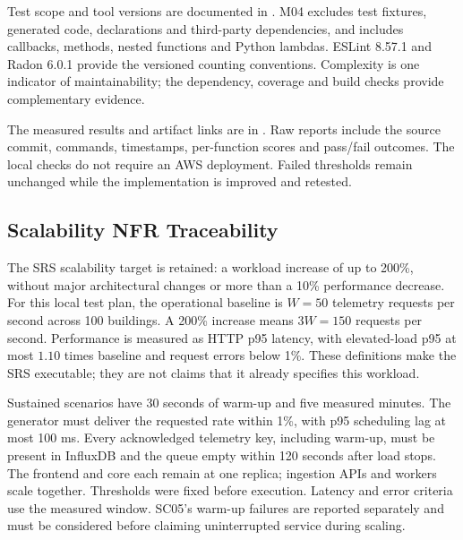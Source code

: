 \documentclass[12pt, a4paper]{article}
\begin{document}
Test scope and tool versions are documented in
. M04 excludes test fixtures, generated
code, declarations and third-party dependencies, and includes callbacks, methods,
nested functions and Python lambdas. ESLint 8.57.1 and Radon 6.0.1 provide the
versioned counting conventions. Complexity is one indicator of maintainability;
the dependency, coverage and build checks provide complementary evidence.

The measured results and artifact links are in
. Raw reports include the
source commit, commands, timestamps, per-function scores and pass/fail outcomes.
The local checks do not require an AWS deployment. Failed thresholds remain
unchanged while the implementation is improved and retested.

\newpage
\subsection{Scalability NFR Traceability}
The SRS scalability target is retained: a workload increase of up to 200\%,
without major architectural changes or more than a 10\% performance decrease.
For this local test plan, the operational baseline is $W=50$ telemetry requests
per second across 100 buildings. A 200\% increase means $3W=150$ requests per
second. Performance is measured as HTTP p95 latency, with elevated-load p95 at
most $1.10$ times baseline and request errors below 1\%. These definitions make
the SRS executable; they are not claims that it already specifies this workload.

Sustained scenarios have 30 seconds of warm-up and five measured minutes.
The generator must deliver the requested rate within 1\%, with p95 scheduling
lag at most 100 ms. Every acknowledged telemetry key, including warm-up, must
be present in InfluxDB and the queue empty within 120 seconds after load stops.
The frontend and core each remain at one replica; ingestion APIs and workers
scale together. Thresholds were fixed before execution.
Latency and error criteria use the measured window. SC05's warm-up failures
are reported separately and must be considered before claiming uninterrupted
service during scaling.
\end{document}

